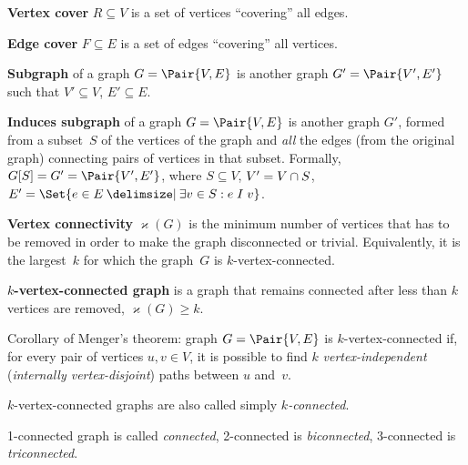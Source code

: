 \documentclass[a4paper,10pt]{article}
\newcommand{\vertexConnectivity}[1]{\varkappa(#1)}
\begin{document}
\begin{terms}
    \item \textbf{Vertex cover} $R \subseteq V$ is a set of vertices \enquote{covering} all edges.

    \item \textbf{Edge cover} $F \subseteq E$ is a set of edges \enquote{covering} all vertices.

    \item \textbf{Subgraph} of a graph $G = \Pair{V,E}$ is another graph $G' = \Pair{V',E'}$ such that $V' \subseteq V$, $E' \subseteq E$.

    \item \textbf{Induces subgraph} of a graph $G = \Pair{V,E}$ is another graph $G'$, formed from a subset~$S$ of the vertices of the graph and \emph{all} the edges (from the original graph) connecting pairs of vertices in that subset.
    Formally, $G[S] = G' = \Pair{V',E'}$, where $S \subseteq V$, $V' = V \cap S$, $E' = \Set{e \in E \given \exists v \in S: e \mathrel{I} v}$.

    \item \textbf{Vertex connectivity} $\vertexConnectivity{G}$ is the minimum number of vertices that has to be removed in order to make the graph disconnected or trivial.
    Equivalently, it is the largest~$k$ for which the graph~$G$ is $k$-vertex-connected.

    \item \textbf{$k$-vertex-connected graph} is a graph that remains connected after less than $k$ vertices are removed, \ie $\vertexConnectivity{G} \geq k$.

    \begin{items}
        \item Corollary of Menger's theorem: graph $G = \Pair{V,E}$ is $k$-vertex-connected if, for every pair of vertices $u,v \in V$, it is possible to find $k$ \emph{vertex-independent} (\emph{internally vertex-disjoint}) paths between $u$ and~$v$.
        \item $k$-vertex-connected graphs are also called simply \emph{$k$-connected}.
        \item 1-connected graph is called \emph{connected}, 2-connected is \emph{biconnected}, 3-connected is \emph{triconnected}.
    \end{items}


\end{terms}
\end{document}
